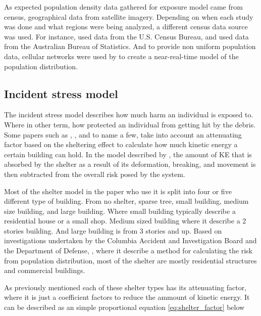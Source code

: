 \documentclass[12pt]{report}
\begin{document}
            As expected population density data gathered for exposure model came from census, geographical data from
            satellite imagery. Depending on when each study was done and what regions were being analyzed, a different
            census data source was used. For instance, \cite{burke_system-level_2011} used data from the U.S. Census Bureau, and \cite{clothier_casualty_2007} used data
            from the Australian Bureau of Statistics. And to provide non uniform population data, cellular networks were
            used by \cite{ancel_real-time_2017} to create a near-real-time model of the population distribution.

        \subsection{Incident stress model}
            The incident stress model describes how much harm an individual is exposed to. Where in other term, how
            protected an individual from getting hit by the debris. Some papers such as \cite{primatesta_ground_2020},
            \cite{cour-harbo_ground_2020}, and \cite{dalamagkidis_evaluating_2008} to name a few, take into account an
            attenuating factor based on the sheltering effect to calculate how much kinetic energy a certain building
            can hold. In the model described by \cite{ball_crash_2012}, the amount of KE that is absorbed by the shelter
            as a result of its deformation, breaking, and movement is then subtracted from the overall risk posed by the
            system.

            Most of the shelter model in the paper who use it is split into four or five different type of building.
            From no shelter, sparse tree, small building, medium size building, and large building. Where small building
            typically describe a residential house or a small shop. Medium sized building where it describe a 2 stories
            building. And large building is from 3 stories and up. Based on investigations undertaken by the Columbia
            Accident and Investigation Board and the Department of Defense, \cite{melnyk_third-party_2014}, where it
            describe a method for calculating the risk from population distribution, most of the shelter are mostly
            residential structures and commercial buildings.

            As previously mentioned each of these shelter types has its attenuating factor, where it is just a
            coefficient factors to reduce the ammount of kinetic energy. It can be described as an simple proportional
            equation \ref{eq:shelter_factor} below
\end{document}
